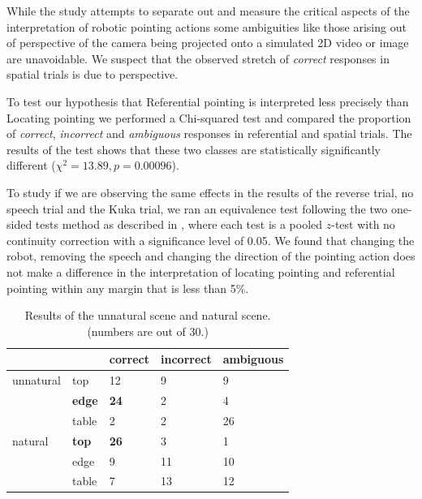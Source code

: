 While the study attempts to separate out and measure the critical aspects of the interpretation of robotic pointing actions some ambiguities like those arising out of perspective of the camera being projected onto a simulated 2D video or image are unavoidable. We suspect that the observed stretch of \textit{correct} responses in spatial trials is due to perspective.

To test our hypothesis that Referential pointing is interpreted less precisely than Locating pointing we performed a Chi-squared test and compared the proportion of \textit{correct}, \textit{incorrect} and \textit{ambiguous} responses in referential and spatial trials. The results of the test shows that these two classes are statistically significantly different ($\chi^2= 13.89, p = 0.00096$).

To study if we are observing the same effects in the results of the reverse trial, no speech trial and the Kuka trial, we ran an equivalence test following the two one-sided tests method as described in \cite{lakens2017equivalence}, where each test is a pooled $z$-test with no continuity
correction with a significance level of 0.05. We found that changing the robot, removing the speech and changing the direction of the pointing action does not make a difference in the interpretation of locating pointing and referential pointing within any margin that is less than 5\%.


\begin{table}[h]
\label{tab:naturaltrial}
\begin{tabular}{lllll}
          &               & correct     & incorrect & ambiguous \\ \hline
unnatural & top           & 12          & 9         & 9         \\
          & \textbf{edge} & \textbf{24} & 2         & 4         \\
          & table         & 2           & 2         & 26        \\ \hline
natural   & \textbf{top}  & \textbf{26} & 3         & 1         \\
          & edge          & 9           & 11        & 10        \\
          & table         & 7           & 13        & 12        \\ \hline
\end{tabular}
\caption{Results of the unnatural scene and natural scene. (numbers are out of 30.)}
\label{tab:natural-unnatural}
\end{table}

